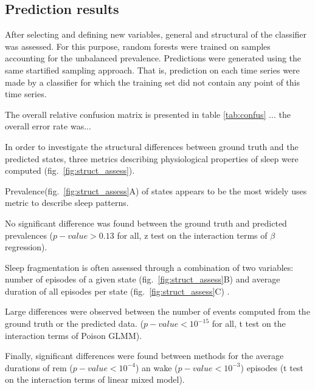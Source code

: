 


\subsection{Prediction results}



After selecting and defining new variables, general and structural of the classifier was assessed.
For this purpose, random forests were trained on samples accounting for the unbalanced prevalence.
Predictions were generated using the same startified sampling approach. 
That is, prediction on each time series were made by a classifier for which the training set did not contain any point of this time series.

The overall relative confusion matrix is presented in table \ref{tab:confus}
... the overall error rate was...

In order to investigate the structural differences between ground truth and the predicted states,
three metrics describing physiological properties of sleep were computed (fig.~\ref{fig:struct_assess}).

Prevalence(fig.~\ref{fig:struct_assess}A) of states appears to be the most widely uses metric to describe sleep patterns\citationneeded{}. 

No significant difference was found between the ground truth and predicted prevalences ($p-value > 0.13$ for all, z test on the interaction terms of $\beta$ regression).

Sleep fragmentation is often assessed through a combination of two variables: number of episodes of a given state (fig.~\ref{fig:struct_assess}B) and average duration of all episodes per state (fig.~\ref{fig:struct_assess}C) \citationneeded{}.

Large differences were observed between the number of events computed from the ground truth or the predicted data.
($p-value < 10^{-15}$ for all, t test on the interaction terms of Poison GLMM).

Finally, significant differences were found between methods for the average durations of \gls{rem} ($p-value < 10^{-4}$) an wake ($p-value < 10^{-3}$) episodes
(t test on the interaction terms of linear mixed model).

